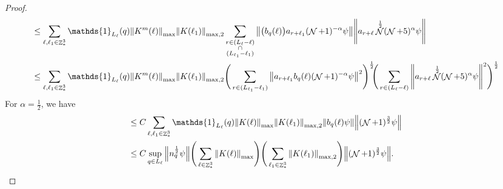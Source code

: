 \documentclass[sn-mathphys, Numbered ,a4paper]{sn-jnl}%
\DeclareMathOperator{\Z}{\mathbb{Z}}
\DeclareMathOperator{\NN}{\mathcal{N}}
\newcommand{\half}{\frac{1}{2}}
\theoremstyle{plain}
\theoremstyle{definition}
\theoremstyle{remark}
\theoremstyle{plain}
\theoremstyle{definition}
\theoremstyle{remark}
\begin{document}
\begin{proof}
\begin{align}
		&\leq \sum\limits_{\ell,\ell_1 \in \Z^3_*} \mathds{1}_{L_\ell}(q) \norm{K^{m}(\ell)}_{\mathrm{max}}\norm{K(\ell_1)}_{\mathrm{max},2} \sum\limits_{\substack{r \in (L_\ell-\ell) \\ \cap \\ (L_{\ell_1}-\ell_1)}} \norm{\big(b_{q}(\ell)\big) a_{r+\ell_1} (\NN+1)^{-\alpha} \psi} \norm { a_{r+\ell}\NN^\half (\NN+5)^{\alpha} \psi }\nonumber\\
		&\leq \sum\limits_{\ell,\ell_1 \in \Z^3_*} \mathds{1}_{L_\ell}(q) \norm{K^{m}(\ell)}_{\mathrm{max}}\norm{K(\ell_1)}_{\mathrm{max},2} \Bigg(\sum\limits_{r \in (L_{\ell_1}-\ell_1)} \norm{ a_{r+\ell_1}b_{q}(\ell) (\NN+1)^{-\alpha} \psi}^2\Bigg)^\half\!\!\Bigg( \sum\limits_{r \in (L_\ell-\ell)} \norm { a_{r+\ell}\NN^\half (\NN+5)^{\alpha} \psi }^2\Bigg)^\half\nonumber\\
	\end{align}
	For $\alpha = \half$, we have
	\begin{align}
		&\leq C\sum\limits_{\ell,\ell_1 \in \Z^3_*} \mathds{1}_{L_\ell}(q) \norm{K(\ell)}_{\mathrm{max}}\norm{K(\ell_1)}_{\mathrm{max},2}  \norm{b_{q}(\ell) \psi} \norm { (\NN+1)^{\frac{3}{2}} \psi }\nonumber\\
		&\leq C \sup\limits_{q \in L_\ell} \norm{n_{q}^{\half} \psi} \Bigg(\sum\limits_{\ell \in \Z^3_*} \norm{K(\ell)}_{\mathrm{max}}\Bigg)\Bigg( \sum\limits_{\ell_1 \in \Z^3_*}\norm{K(\ell_1)}_{\mathrm{max},2} \Bigg)  \norm { (\NN+1)^{\frac{3}{2}} \psi }. 
	\end{align}
\end{proof}
\end{document}
